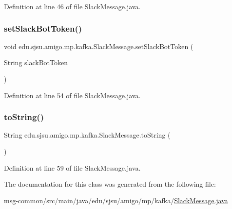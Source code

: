 Definition at line 46 of file Slack\+Message.\+java.

\mbox{\label{classedu_1_1sjsu_1_1amigo_1_1mp_1_1kafka_1_1_slack_message_a612e1be2f19bb280ee03bea01e6a0d3f}} 
\subsubsection{\texorpdfstring{set\+Slack\+Bot\+Token()}{setSlackBotToken()}}
{\footnotesize\ttfamily void edu.\+sjsu.\+amigo.\+mp.\+kafka.\+Slack\+Message.\+set\+Slack\+Bot\+Token (\begin{DoxyParamCaption}\item[{String}]{slack\+Bot\+Token }\end{DoxyParamCaption})}



Definition at line 54 of file Slack\+Message.\+java.

\mbox{\label{classedu_1_1sjsu_1_1amigo_1_1mp_1_1kafka_1_1_slack_message_ab9ff1aa8ed0f03537e1e6020c5cebd29}} 
\subsubsection{\texorpdfstring{to\+String()}{toString()}}
{\footnotesize\ttfamily String edu.\+sjsu.\+amigo.\+mp.\+kafka.\+Slack\+Message.\+to\+String (\begin{DoxyParamCaption}{ }\end{DoxyParamCaption})}



Definition at line 59 of file Slack\+Message.\+java.



The documentation for this class was generated from the following file\+:\begin{DoxyCompactItemize}
\item 
msg-\/common/src/main/java/edu/sjsu/amigo/mp/kafka/\hyperlink{_slack_message_8java}{Slack\+Message.\+java}\end{DoxyCompactItemize}
